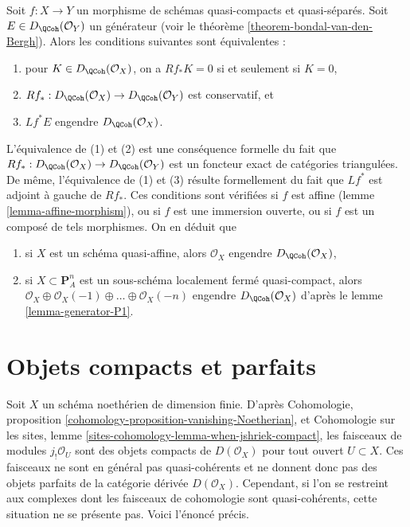 \begin{remark}
\label{remark-pullback-generator}
Soit $f : X \to Y$ un morphisme de schémas quasi-compacts et quasi-séparés.
Soit $E \in D_\QCoh(\mathcal{O}_Y)$ un générateur
(voir le théorème \ref{theorem-bondal-van-den-Bergh}).
Alors les conditions suivantes sont équivalentes :
\begin{enumerate}
\item pour $K \in D_\QCoh(\mathcal{O}_X)$, on a
$Rf_*K = 0$ si et seulement si $K = 0$,
\item $Rf_* : D_\QCoh(\mathcal{O}_X) \to D_\QCoh(\mathcal{O}_Y)$
est conservatif, et
\item $Lf^*E$ engendre $D_\QCoh(\mathcal{O}_X)$.
\end{enumerate}
L'équivalence de (1) et (2) est une conséquence formelle du fait que
$Rf_* : D_\QCoh(\mathcal{O}_X) \to D_\QCoh(\mathcal{O}_Y)$ est un
foncteur exact de catégories triangulées. De même, l'équivalence
de (1) et (3) résulte formellement du fait que $Lf^*$
est adjoint à gauche de $Rf_*$.
Ces conditions sont vérifiées si $f$ est affine (lemme \ref{lemma-affine-morphism}),
ou si $f$ est une immersion ouverte, ou si $f$ est un composé de tels morphismes.
On en déduit que
\begin{enumerate}
\item si $X$ est un schéma quasi-affine, alors $\mathcal{O}_X$ engendre
$D_\QCoh(\mathcal{O}_X)$,
\item si $X \subset \mathbf{P}^n_A$ est un
sous-schéma localement fermé quasi-compact, alors
$\mathcal{O}_X \oplus \mathcal{O}_X(-1) \oplus \ldots \oplus \mathcal{O}_X(-n)$
engendre $D_\QCoh(\mathcal{O}_X)$ d'après le
lemme \ref{lemma-generator-P1}.
\end{enumerate}
\end{remark}




\section{Objets compacts et parfaits}
\label{section-compact}

\noindent
Soit $X$ un schéma noethérien de dimension finie. D'après
Cohomologie, proposition \ref{cohomology-proposition-vanishing-Noetherian},
et
Cohomologie sur les sites, lemme \ref{sites-cohomology-lemma-when-jshriek-compact},
les faisceaux de modules $j_!\mathcal{O}_U$ sont des objets compacts
de $D(\mathcal{O}_X)$ pour tout ouvert $U \subset X$.
Ces faisceaux ne sont en général pas quasi-cohérents et ne donnent donc pas
des objets parfaits de la catégorie dérivée $D(\mathcal{O}_X)$.
Cependant, si l'on se restreint aux complexes dont les faisceaux de cohomologie
sont quasi-cohérents, cette situation ne se présente pas.
Voici l'énoncé précis.

